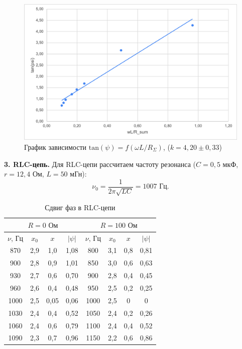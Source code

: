 \documentclass[a4paper, 12pt]{article}
\begin{document}
    \begin{figure}[ht]
        \centering
        \includegraphics[width=0.84\linewidth]{images/RL-graph.png}
        \caption{График зависимости $\mathrm{tan}(\psi) = f(\omega L / R_{\Sigma})$, ($k = 4,20 \pm 0,33$)}
    \end{figure}
    
    \newpage
    
    {\bf 3. RLC-цепь.} Для RLC-цепи рассчитаем частоту резонанса ($C = 0,5 \text{ мкФ}$, $r = 12,4 \text{ Ом}$, $L = 50 \text{ мГн}$):
    \begin{equation}
        \nu_0 = \frac{1}{2 \pi \sqrt{L C}} = 1007 \text{ Гц}.
    \end{equation}
    
    \begin{table}[ht]
        \centering
        \begin{tabular}{|c|c|c|c|c|c|c|c|}
            \hline
            \multicolumn{4}{|c|}{$R = 0 \text{ Ом}$} & \multicolumn{4}{c|}{$R = 100 \text{ Ом}$} \\
            \hline
            $\nu$, $\text{Гц}$ & $x_0$ & $x$ & $|\psi|$ & $\nu$, $\text{Гц}$ & $x_0$ & $x$ & $|\psi|$ \\
            \hline
            870 & 2,9 & 1,0 & 1,08 & 800 & 3,1 & 0,8 & 0,81 \\
            \hline
            900 & 2,8 & 0,9 & 1,01 & 850 & 3,0 & 0,6 & 0,63 \\
            \hline
            930 & 2,7 & 0,6 & 0,70 & 900 & 2,8 & 0,4 & 0,45 \\
            \hline
            960 & 2,6 & 0,4 & 0,48 & 950 & 2,5 & 0,2 & 0,25 \\
            \hline
            1000 & 2,5 & 0,05 & 0,06 & 1000 & 2,5 & 0 & 0 \\
            \hline
            1030 & 2,4 & 0,4 & 0,52 & 1050 & 2,4 & 0,2 & 0,26 \\
            \hline
            1060 & 2,4 & 0,6 & 0,79 & 1100 & 2,4 & 0,4 & 0,52 \\
            \hline
            1090 & 2,3 & 0,7 & 0,96 & 1150 & 2,2 & 0,6 & 0,86 \\
            \hline
        \end{tabular}
        \caption{Сдвиг фаз в RLC-цепи}
    \end{table}
    
\end{document}
